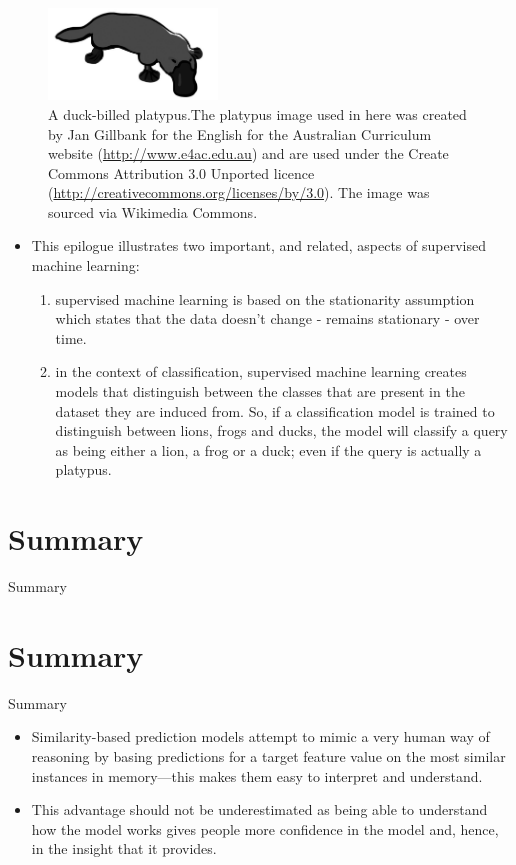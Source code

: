 \documentclass[xcolor={table}]{beamer}
\newcommand{\SectionSlide}[2][]{
	\ifthenelse{\isempty{#1}}
		{\section{#2}\begin{frame} \begin{center}\begin{huge}#2\end{huge}\end{center}\end{frame}}
		{\section[#1]{#2}\begin{frame} \begin{center}\begin{huge}#2\end{huge}\end{center}\end{frame}}
}
\begin{document}
 \begin{frame} 
\begin{figure}
	\begin{center}
	\includegraphics[width=0.4\textwidth]{./images/PlatypusBW.png}
	\end{center}
	\caption{A duck-billed platypus.The platypus image used in here was created by Jan Gillbank for the English for the Australian Curriculum website (\url{http://www.e4ac.edu.au}) and are used under the Create Commons Attribution 3.0 Unported licence (\url{http://creativecommons.org/licenses/by/3.0}). The image was sourced via Wikimedia Commons.}
	\label{fig:platypus}
\end{figure}
\end{frame} 

\begin{frame}
\begin{itemize}
\item This epilogue illustrates two important, and related, aspects of supervised machine learning:
\begin{enumerate}
	\item supervised machine learning is based on the \alert{stationarity assumption} which states that the data doesn't change - remains stationary - over time. 
	\item in the context of classification, supervised machine learning creates models that distinguish between the classes that are present in the dataset they are induced from. So, if a classification model is trained to distinguish between lions, frogs and ducks, the model will classify a query as being either a lion, a frog or a duck; even if the query is actually a platypus.
\end{enumerate}

\end{itemize} 
\end{frame} 

\SectionSlide{Summary}

\begin{frame}
\begin{itemize}
\item Similarity-based prediction models attempt to mimic a very human way of reasoning by basing predictions for a  target feature value on the most similar instances in memory---this makes them easy to interpret and understand. 
\item This advantage should not be underestimated as being able to understand how the model works gives people more confidence in the model and, hence, in the insight that it provides.
\end{itemize}
\end{frame}
\end{document}
